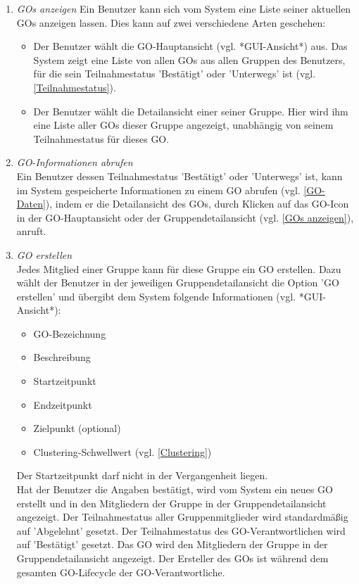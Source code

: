 \documentclass[parskip=full]{scrartcl}
\def\threedigits#1{%
  \ifnum#1<100 0\fi
  \ifnum#1<10 0\fi
  \number#1}
\begin{document}
\begin{enumerate}[label={\textbf{/F\protect\threedigits{\theenumi}0/}}, leftmargin=*, resume]	

	\item \textit{GOs anzeigen}\label{GOs anzeigen} Ein Benutzer kann sich vom System eine Liste seiner aktuellen GOs anzeigen lassen. Dies kann auf zwei verschiedene Arten geschehen:
	\begin{itemize}
		\item Der Benutzer wählt die GO-Hauptansicht (vgl. *GUI-Ansicht*) aus. Das System zeigt eine Liste von allen GOs aus allen Gruppen des Benutzers, für die sein Teilnahmestatus 'Bestätigt' oder 'Unterwegs' ist (vgl. \ref{Teilnahmestatus}).
		\item Der Benutzer wählt die Detailansicht einer seiner Gruppe. Hier wird ihm eine Liste aller GOs dieser Gruppe angezeigt, unabhängig von seinem Teilnahmestatus für dieses GO.
	\end{itemize}
	
	\item \textit{GO-Informationen abrufen} \\
	Ein Benutzer dessen Teilnahmestatus 'Bestätigt' oder 'Unterwegs' ist, kann im System gespeicherte Informationen zu einem GO abrufen (vgl. \ref{GO-Daten}), indem er die Detailansicht des GOs, durch Klicken auf das GO-Icon in der GO-Hauptansicht oder der Gruppendetailansicht (vgl. \ref{GOs anzeigen}), anruft.

	\item \textit{GO erstellen} \\
	Jedes Mitglied einer Gruppe kann für diese Gruppe ein GO erstellen. Dazu wählt der Benutzer in der jeweiligen Gruppendetailansicht die Option 'GO erstellen' und übergibt dem System folgende Informationen (vgl. *GUI-Ansicht*):
	\begin{itemize}
		\item GO-Bezeichnung
		\item Beschreibung
		\item Startzeitpunkt
		\item Endzeitpunkt 
		\item Zielpunkt (optional)
		\item \colorbox{shadecolor}{Clustering-Schwellwert (vgl. \ref{Clustering})}
	\end{itemize}
Der Startzeitpunkt darf nicht in der Vergangenheit liegen.\\
Hat der Benutzer die Angaben bestätigt, wird vom System ein neues GO erstellt und in den Mitgliedern der Gruppe in der Gruppendetailansicht angezeigt. Der Teilnahmestatus aller Gruppenmitglieder wird standardmäßig auf 'Abgelehnt' gesetzt. Der Teilnahmestatus des GO-Verantwortlichen wird auf 'Bestätigt' gesetzt.
Das GO wird den Mitgliedern der Gruppe in der Gruppendetailansicht angezeigt.
Der Ersteller des GOs ist während dem gesamten GO-Lifecycle der GO-Verantwortliche.
	

\end{enumerate}
\end{document}
